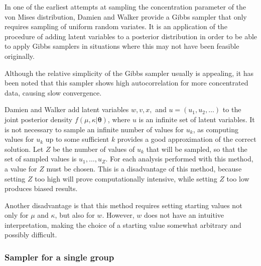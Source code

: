 \documentclass[]{gSCS2e}
\theoremstyle{plain}
\theoremstyle{definition}
\theoremstyle{remark}
\begin{document}
In one of the earliest attempts at sampling the concentration parameter of the von Mises distribution, Damien and Walker \cite{damien1999fullbayes} provide a Gibbs sampler that only requires sampling of uniform random variates. It is an application of the procedure of adding latent variables to a posterior distribution in order to be able to apply Gibbs samplers in situations where this may not have been feasible originally.\cite{damlen1999auxiliary}

Although the relative simplicity of the Gibbs sampler usually is appealing, it has been noted that this sampler shows high autocorrelation for more concentrated data, causing slow convergence.\cite[p. 990]{nunez2005bayesian} %

Damien and Walker \cite{damien1999fullbayes} add latent variables $w, v, x,$ and $u=(u_1, u_2, \dots)$ to the joint posterior density $f(\mu, \kappa \vert \boldsymbol\theta)$, where $u$ is an infinite set of latent variables. It is not necessary to sample an infinite number of values for $u_k$, as computing values for $u_k$ up to some sufficient $k$ provides a good approximation of the correct solution. Let $Z$ be the number of values of $u_k$ that will be sampled, so that the set of sampled values is $u_1, \dots, u_Z$. For each analysis performed with this method, a value for $Z$ must be chosen. This is a disadvantage of this method, because setting $Z$ too high will prove computationally intensive, while setting $Z$ too low produces biased results. 

Another disadvantage is that this method requires setting starting values  not only for $\mu$ and $\kappa$, but also for $w$. However, $w$ does not have an intuitive interpretation, making the choice of a starting value somewhat arbitrary and possibly difficult. %

\subsubsection{Sampler for a single group}
\end{document}
